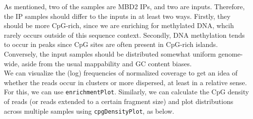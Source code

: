 As mentioned, two of the samples are MBD2 IPs, and two are inputs. Therefore, the IP samples should differ to the inputs in at least two ways. Firstly, they should be more CpG-rich, since we are enriching for methylated DNA, whcih rarely occurs outside of this sequence context. Secondly, DNA methylation tends to occur in peaks since CpG sites are often present in CpG-rich islands.  Conversely, the input samples should be distributed somewhat uniform genome-wide, aside from the usual mappability and GC content biases.\\

We can visualize the (log) frequencies of normalized coverage to get an idea of whether the reads occur in clusters or more dispersed, at least in a relative sense.  For this, we can use \texttt{enrichmentPlot}.  Similarly, we can calculate the CpG density of reads (or reads extended to a certain fragment size) and plot distributions across multiple samples using \texttt{cpgDensityPlot}, as below.


